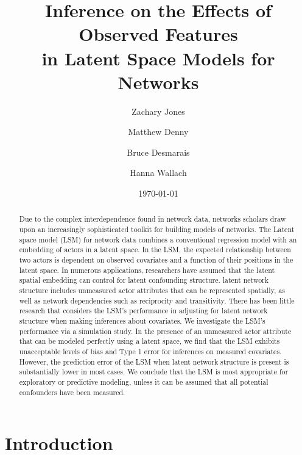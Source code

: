 \documentclass[11pt]{article}
\title{\vspace{-2cm} Inference on the Effects of Observed Features
\\ in Latent Space Models for Networks }
\author{ Zachary Jones \and Matthew Denny \and Bruce Desmarais \and Hanna Wallach} \date{\today}
\begin{document}
\maketitle




\begin{abstract}

\noindent Due to the complex interdependence found in network data,
networks scholars draw upon an increasingly sophisticated
toolkit for building models of networks. The Latent space model (LSM) for
network data combines a conventional regression model with an embedding of actors in a latent space. In the LSM, the expected relationship between two actors is dependent on observed covariates and a function of their positions in the latent space. In numerous applications, researchers have assumed
that the latent spatial embedding can control for latent
confounding structure. latent network structure includes unmeasured actor attributes that can be represented spatially, as well as network dependencies such as reciprocity and transitivity. There has been little research that considers the LSM's
performance in adjusting for latent network structure when making inferences about covariates. We investigate the
LSM's performance via a simulation study. In the presence of an
unmeasured actor attribute that can be modeled perfectly using a latent space,
we find that the LSM exhibits unacceptable levels of bias and Type 1 error for inferences on measured covariates. However, the prediction error of the LSM when latent network structure is present is substantially lower in most cases. We
conclude that the LSM is most appropriate for exploratory or predictive modeling, unless it can be assumed that all potential confounders have been measured.
\end{abstract}
\thispagestyle{empty}
\section{Introduction}
\end{document}
